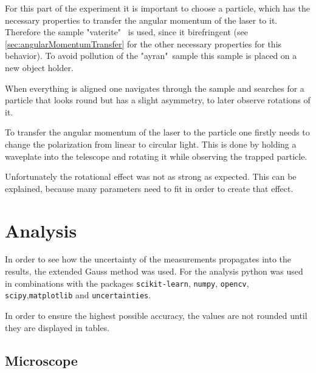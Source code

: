 \documentclass[12pt,english,ngerman]{scrartcl}
\begin{document}
For this part of the experiment it is important to choose a particle, which has
the necessary properties to transfer the angular momentum of the laser to it.
Therefore the sample "vaterite" \ is used, since it birefringent (see
\autoref{sec:angularMomentumTransfer} for the other necessary properties for
this behavior). To avoid pollution of the "ayran"\ sample this sample is placed
on a new object holder.

When everything is aligned one navigates through the sample and searches for a
particle that looks round but has a slight asymmetry, to later observe
rotations of it.

To transfer the angular momentum of the laser to the particle one firstly needs
to change the polarization from linear to circular light. This is done by
holding a waveplate into the telescope and rotating it while observing the
trapped particle.


Unfortunately the rotational effect was not as strong as expected. This can be
explained, because many parameters need to fit in order to create that effect.


\section{Analysis}\label{sec:auswertung}

In order to see how the uncertainty of the measurements propagates into the
results, the extended Gauss method was used. For the analysis python was used
in combinations with the packages \verb#scikit-learn#, \verb#numpy#,
\verb#opencv#, \verb#scipy#,\verb#matplotlib# and \verb#uncertainties#.

In order to ensure the highest possible accuracy, the values are not rounded
until they are displayed in tables.

\subsection{Microscope}
\end{document}

